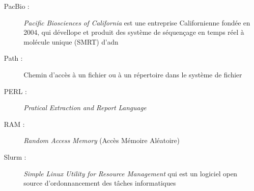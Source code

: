 \begin{description}
    \item[PacBio :] \emph{Pacific Biosciences of California} est une entreprise Californienne fondée en 2004, qui dévellope et produit des système de séquençage en temps réel à molécule unique (SMRT) d'adn
    \item[Path : ] Chemin d'accès à un fichier ou à un répertoire dans le système de fichier
    \item[PERL :] \emph{Pratical Extraction and Report Language}
    \item[RAM :] \emph{Random Access Memory} (Accès Mémoire Aléatoire)
    \item[Slurm :] \emph{Simple Linux Utility for Resource Management} qui est un logiciel open source d'ordonnancement des tâches informatiques
\end{description}